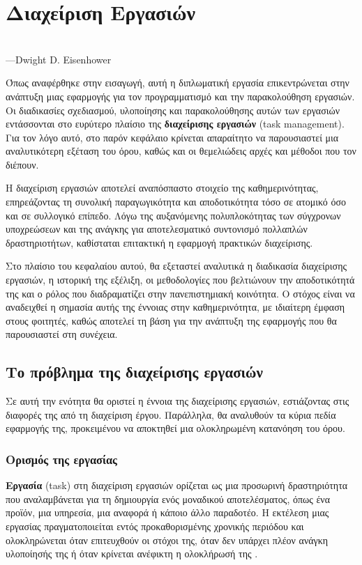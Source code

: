 \chapter{Διαχείριση Εργασιών}
    \begin{displayquote} \centering
         \\
        \hspace*{\fill}---Dwight D. Eisenhower
    \end{displayquote}
    \vspace{1em}

    Όπως αναφέρθηκε στην εισαγωγή, αυτή η διπλωματική εργασία επικεντρώνεται στην ανάπτυξη μιας εφαρμογής για τον προγραμματισμό και την παρακολούθηση εργασιών. Οι διαδικασίες σχεδιασμού, υλοποίησης και παρακολούθησης αυτών των εργασιών εντάσσονται στο ευρύτερο πλαίσιο της \textbf{διαχείρισης εργασιών} (task management). Για τον λόγο αυτό, στο παρόν κεφάλαιο κρίνεται απαραίτητο να παρουσιαστεί μια αναλυτικότερη εξέταση του όρου, καθώς και οι θεμελιώδεις αρχές και μέθοδοι που τον διέπουν.

    Η διαχείριση εργασιών αποτελεί αναπόσπαστο στοιχείο της καθημερινότητας, επηρεάζοντας τη συνολική παραγωγικότητα και αποδοτικότητα τόσο σε ατομικό όσο και σε συλλογικό επίπεδο. Λόγω της αυξανόμενης πολυπλοκότητας των σύγχρονων υποχρεώσεων και της ανάγκης για αποτελεσματικό συντονισμό πολλαπλών δραστηριοτήτων, καθίσταται επιτακτική η εφαρμογή πρακτικών διαχείρισης.

    Στο πλαίσιο του κεφαλαίου αυτού, θα εξεταστεί αναλυτικά η διαδικασία διαχείρισης εργασιών, η ιστορική της εξέλιξη, οι μεθοδολογίες που βελτιώνουν την αποδοτικότητά της και ο ρόλος που διαδραματίζει στην πανεπιστημιακή κοινότητα. Ο στόχος είναι να αναδειχθεί η σημασία αυτής της έννοιας στην καθημερινότητα, με ιδιαίτερη έμφαση στους φοιτητές, καθώς αποτελεί τη βάση για την ανάπτυξη της εφαρμογής που θα παρουσιαστεί στη συνέχεια.

    \section{Το πρόβλημα της διαχείρισης εργασιών}
        Σε αυτή την ενότητα θα οριστεί η έννοια της διαχείρισης εργασιών, εστιάζοντας στις διαφορές της από τη διαχείριση έργου. Παράλληλα, θα αναλυθούν τα κύρια πεδία εφαρμογής της, προκειμένου να αποκτηθεί μια ολοκληρωμένη κατανόηση του όρου.

        \subsection{Ορισμός της εργασίας}
            \textbf{Εργασία} (task) στη διαχείριση εργασιών ορίζεται ως μια προσωρινή δραστηριότητα που αναλαμβάνεται για τη δημιουργία ενός μοναδικού αποτελέσματος, όπως ένα προϊόν, μια υπηρεσία, μια αναφορά ή κάποιο άλλο παραδοτέο. Η εκτέλεση μιας εργασίας πραγματοποιείται εντός προκαθορισμένης χρονικής περιόδου και ολοκληρώνεται όταν επιτευχθούν οι στόχοι της, όταν δεν υπάρχει πλέον ανάγκη υλοποίησής της ή όταν κρίνεται ανέφικτη η ολοκλήρωσή της \cite{PMBOK}.

